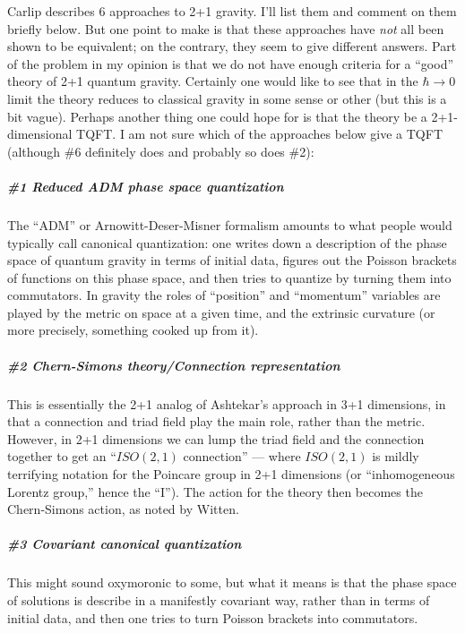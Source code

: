 \documentclass{article}
\begin{document}
Carlip describes 6 approaches to 2+1 gravity. I'll list them and comment
on them briefly below. But one point to make is that these approaches
have \emph{not} all been shown to be equivalent; on the contrary, they
seem to give different answers. Part of the problem in my opinion is
that we do not have enough criteria for a ``good'' theory of 2+1 quantum
gravity. Certainly one would like to see that in the \(\hbar\to 0\)
limit the theory reduces to classical gravity in some sense or other
(but this is a bit vague). Perhaps another thing one could hope for is
that the theory be a 2+1-dimensional TQFT. I am not sure which of the
approaches below give a TQFT (although \#6 definitely does and probably
so does \#2):

\hypertarget{reduced-adm-phase-space-quantization}{%
\subparagraph{\#1 Reduced ADM phase space
quantization}\label{reduced-adm-phase-space-quantization}}

The ``ADM'' or Arnowitt-Deser-Misner formalism amounts to what people
would typically call canonical quantization: one writes down a
description of the phase space of quantum gravity in terms of initial
data, figures out the Poisson brackets of functions on this phase space,
and then tries to quantize by turning them into commutators. In gravity
the roles of ``position'' and ``momentum'' variables are played by the
metric on space at a given time, and the extrinsic curvature (or more
precisely, something cooked up from it).

\hypertarget{chern-simons-theoryconnection-representation}{%
\subparagraph{\#2 Chern-Simons theory/Connection
representation}\label{chern-simons-theoryconnection-representation}}

This is essentially the 2+1 analog of Ashtekar's approach in 3+1
dimensions, in that a connection and triad field play the main role,
rather than the metric. However, in 2+1 dimensions we can lump the triad
field and the connection together to get an ``\(ISO(2,1)\) connection''
--- where \(ISO(2,1)\) is mildly terrifying notation for the Poincare
group in 2+1 dimensions (or ``inhomogeneous Lorentz group,'' hence the
``I''). The action for the theory then becomes the Chern-Simons action,
as noted by Witten.

\hypertarget{covariant-canonical-quantization}{%
\subparagraph{\#3 Covariant canonical
quantization}\label{covariant-canonical-quantization}}

This might sound oxymoronic to some, but what it means is that the phase
space of solutions is describe in a manifestly covariant way, rather
than in terms of initial data, and then one tries to turn Poisson
brackets into commutators.
\end{document}
